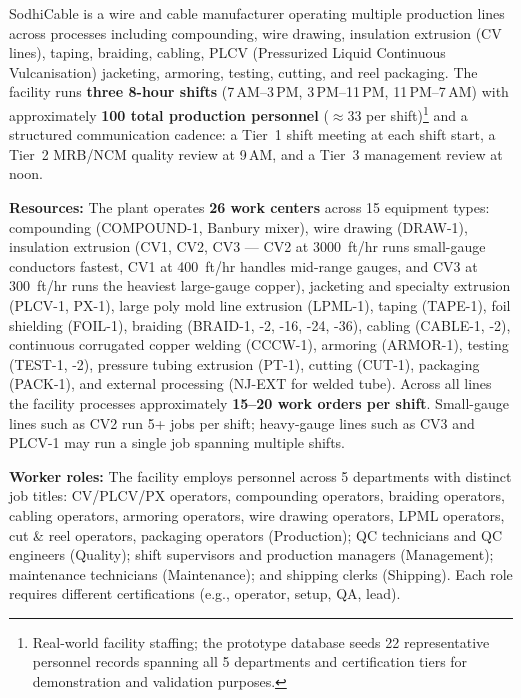 \documentclass[11pt]{article}
\begin{document}
SodhiCable is a wire and cable manufacturer operating multiple production lines across processes including compounding, wire drawing, insulation extrusion (CV lines), taping, braiding, cabling, PLCV (Pressurized Liquid Continuous Vulcanisation) jacketing, armoring, testing, cutting, and reel packaging.  The facility runs \textbf{three 8-hour shifts} (7\,AM--3\,PM, 3\,PM--11\,PM, 11\,PM--7\,AM) with approximately \textbf{100 total production personnel} ($\approx$33 per shift)\footnote{Real-world facility staffing; the prototype database seeds 22 representative personnel records spanning all 5 departments and certification tiers for demonstration and validation purposes.} and a structured communication cadence: a Tier~1 shift meeting at each shift start, a Tier~2 MRB/NCM quality review at 9\,AM, and a Tier~3 management review at noon.

\textbf{Resources:} The plant operates \textbf{26 work centers} across 15 equipment types: compounding (COMPOUND-1, Banbury mixer), wire drawing (DRAW-1), insulation extrusion (CV1, CV2, CV3 --- CV2 at 3000~ft/hr runs small-gauge conductors fastest, CV1 at 400~ft/hr handles mid-range gauges, and CV3 at 300~ft/hr runs the heaviest large-gauge copper), jacketing and specialty extrusion (PLCV-1, PX-1), large poly mold line extrusion (LPML-1), taping (TAPE-1), foil shielding (FOIL-1), braiding (BRAID-1, -2, -16, -24, -36), cabling (CABLE-1, -2), continuous corrugated copper welding (CCCW-1), armoring (ARMOR-1), testing (TEST-1, -2), pressure tubing extrusion (PT-1), cutting (CUT-1), packaging (PACK-1), and external processing (NJ-EXT for welded tube).  Across all lines the facility processes approximately \textbf{15--20 work orders per shift}.  Small-gauge lines such as CV2 run 5+ jobs per shift; heavy-gauge lines such as CV3 and PLCV-1 may run a single job spanning multiple shifts.

\textbf{Worker roles:} The facility employs personnel across 5 departments with distinct job titles: CV/PLCV/PX operators, compounding operators, braiding operators, cabling operators, armoring operators, wire drawing operators, LPML operators, cut \& reel operators, packaging operators (Production); QC technicians and QC engineers (Quality); shift supervisors and production managers (Management); maintenance technicians (Maintenance); and shipping clerks (Shipping).  Each role requires different certifications (e.g., operator, setup, QA, lead).
\end{document}
